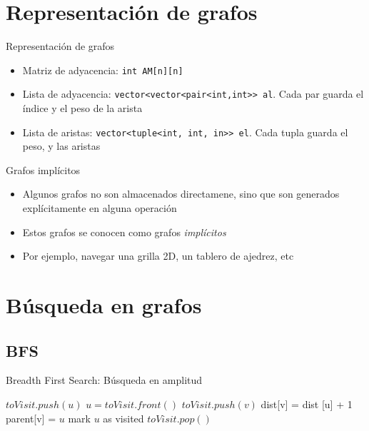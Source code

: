 \documentclass[]{beamer}
\begin{document}
\section{Representaci\'on de grafos}
\begin{frame}{Representaci\'on de grafos}
  \begin{itemize}
    \item Matriz de adyacencia: \texttt{int AM[n][n]}
      \pause
    \item Lista de adyacencia: \texttt{vector<vector<pair<int,int>> al}. Cada par guarda el \'indice y el peso de la arista
      \pause
    \item Lista de aristas: \texttt{vector<tuple<int, int, in>> el}. Cada tupla guarda el peso, y las aristas
  \end{itemize}
\end{frame}

\begin{frame}{Grafos impl\'icitos}
  \begin{itemize}
    \item Algunos grafos no son almacenados directamene, sino que son generados expl\'icitamente en alguna operaci\'on
      \pause
    \item Estos grafos se conocen como grafos \textit{impl\'icitos}
      \pause
    \item Por ejemplo, navegar una grilla 2D, un tablero de ajedrez, etc
  \end{itemize}
\end{frame}

\section{B\'usqueda en grafos}
\subsection{BFS}
\begin{frame}{Breadth First Search: B\'usqueda en amplitud}
  \begin{algorithm}[H]
    {$ toVisit.push(u) $} 
    {
      $u = toVisit.front() $ \;
      {
        {
          {$ toVisit.push(v)  $} \;
          { dist[v] = dist [u] + 1 } \;
          { parent[v] = $u$ } \;
          { mark $u$ as visited } \;
        }
      }
      { $toVisit.pop()$ }
    }
  \end{algorithm}
\end{frame}
\end{document}
